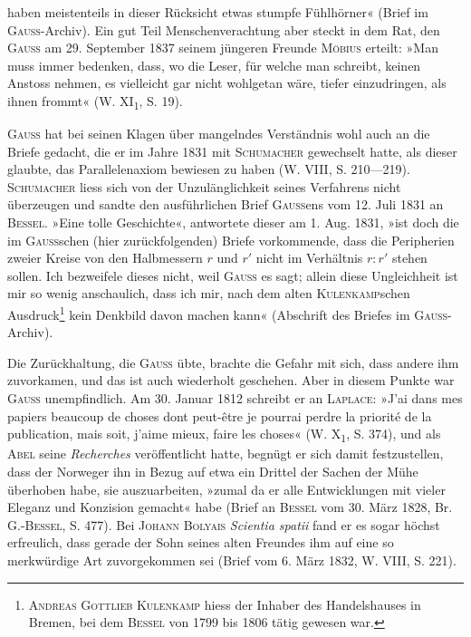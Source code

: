haben meistenteils in dieser Rücksicht etwas stumpfe Fühlhörner« (Brief im
\textsc{Gauss}-Archiv). Ein gut Teil Menschenverachtung aber steckt in dem Rat, den
\textsc{Gauss} am 29. September 1837 seinem jüngeren Freunde \textsc{Möbius} erteilt: »Man
\clearpage{}\setcounter{footnote}{0}
\noindent muss immer bedenken, dass, wo die Leser, für welche man schreibt, keinen
Anstoss nehmen, es vielleicht gar nicht wohlgetan wäre, tiefer einzudringen,
als ihnen frommt« (W. XI\textsubscript{1}, S. 19).
\par
\textsc{Gauss} hat bei seinen Klagen über mangelndes Verständnis wohl auch an
die Briefe gedacht, die er im Jahre 1831 mit \textsc{Schumacher} gewechselt hatte,
als dieser glaubte, das Parallelenaxiom bewiesen zu haben (W. VIII, S. 210—219).
\textsc{Schumacher} liess sich von der Unzulänglichkeit seines Verfahrens nicht
überzeugen und sandte den ausführlichen Brief \textsc{Gauss}ens vom 12. Juli 1831
an \textsc{Bessel}. »Eine tolle Geschichte«, antwortete dieser am 1. Aug. 1831, »ist
doch die im \textsc{Gauss}schen (hier zurückfolgenden) Briefe vorkommende, dass die
Peripherien zweier Kreise von den Halbmessern \(r\) und \(r'\) nicht im Verhältnis
\(r:r'\) stehen sollen. Ich bezweifele dieses nicht, weil \textsc{Gauss} es sagt; allein
diese Ungleichheit ist mir so wenig anschaulich, dass ich mir, nach dem alten
\textsc{Kulenkamp}schen Ausdruck\footnote{\textsc{Andreas Gottlieb Kulenkamp} hiess der Inhaber des Handelshauses in Bremen, bei dem \textsc{Bessel} von 1799 bis 1806 tätig gewesen war.} kein Denkbild davon machen kann« (Abschrift
des Briefes im \textsc{Gauss}-Archiv).
\par
Die Zurückhaltung, die \textsc{Gauss} übte, brachte die Gefahr mit sich, dass
andere ihm zuvorkamen, und das ist auch wiederholt geschehen. Aber in
diesem Punkte war \textsc{Gauss} unempfindlich. Am 30. Januar 1812 schreibt er
an \textsc{Laplace}: »J’ai dans mes papiers beaucoup de choses dont peut-être je
pourrai perdre la priorité de la publication, mais soit, j’aime mieux, faire
 les choses« (W. X\textsubscript{1}, S. 374), und als \textsc{Abel} seine \textit{Recherches} veröffentlicht
hatte, begnügt er sich damit festzustellen, dass der Norweger ihn in
Bezug auf etwa ein Drittel der Sachen der Mühe überhoben habe, sie auszuarbeiten,
»zumal da er alle Entwicklungen mit vieler Eleganz und Konzision
gemacht« habe (Brief an \textsc{Bessel} vom 30. März 1828, Br. G.-\textsc{Bessel},
S. 477). Bei \textsc{Johann Bolyais} \textit{Scientia spatii} fand er es sogar höchst erfreulich,
dass gerade der Sohn seines alten Freundes ihm auf eine so merkwürdige Art
zuvorgekommen sei (Brief vom 6. März 1832, W. VIII, S. 221).
\clearpage\endgroup
